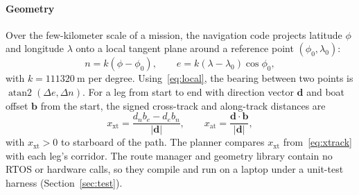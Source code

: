 \paragraph*{Geometry}
Over the few-kilometer scale of a mission, the navigation code projects
latitude $\phi$ and longitude $\lambda$ onto a local tangent plane around a
reference point $(\phi_0, \lambda_0)$:
\begin{equation}
n = k(\phi - \phi_0), \qquad e = k(\lambda - \lambda_0)\cos\phi_0 ,
\label{eq:local}
\end{equation}
with $k = \SI{111320}{\meter}$ per degree. Using~\eqref{eq:local}, the bearing between two points is
$\operatorname{atan2}(\Delta e, \Delta n)$. For a leg from start to end with
direction vector $\mathbf{d}$ and boat offset $\mathbf{b}$ from the start, the
signed cross-track and along-track distances are
\begin{equation}
x_{\mathrm{xt}} = \frac{d_n b_e - d_e b_n}{|\mathbf{d}|}, \qquad
x_{\mathrm{at}} = \frac{\mathbf{d}\cdot\mathbf{b}}{|\mathbf{d}|},
\label{eq:xtrack}
\end{equation}
with $x_{\mathrm{xt}} > 0$ to starboard of the path. The planner compares $x_{\mathrm{xt}}$ from~\eqref{eq:xtrack} with each leg's corridor. The route manager and
geometry library contain no RTOS or hardware calls, so they compile and run on
a laptop under a unit-test harness (Section~\ref{sec:test}).

